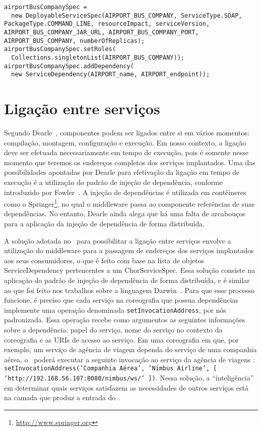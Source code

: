 \lstset{
language=Java,
}

{\scriptsize
\begin{lstlisting}[breaklines, caption={Trecho da especificação de uma coreografia.}, label={lst:service_spec}]
airportBusCompanySpec =
  new DeployableServiceSpec(AIRPORT_BUS_COMPANY, ServiceType.SOAP, PackageType.COMMAND_LINE, resourceImpact, serviceVersion, AIRPORT_BUS_COMPANY_JAR_URL, AIRPORT_BUS_COMPANY_PORT, AIRPORT_BUS_COMPANY, numberOfReplicas);
airportBusCompanySpec.setRoles(
  Collections.singletonList(AIRPORT_BUS_COMPANY));
airportBusCompanySpec.addDependency(
  new ServiceDependency(AIRPORT_name, AIRPORT_endpoint));
\end{lstlisting}
}

\section{Ligação entre serviços}
\label{sec:ligacao}

Segundo Dearle~\cite{Dearle2007PastPresentFuture}, componentes podem ser ligados entre si em vários momentos: compilação, montagem, configuração e execução. Em nosso contexto, a ligação deve ser efetuada necessariamente em tempo de execução, pois é somente nesse momento que teremos os endereços completos dos serviços implantados. Uma das possibilidades apontadas por Dearle para efetivação da ligação em tempo de execução é a utilização do padrão de injeção de dependência, conforme introduzido por Fowler~\cite{Fowler2004Inversion}. A injeção de dependências é utilizada em contêineres como o Springer\footnote{\url{http://www.springer.org}}, no qual o middleware passa ao componente referências de suas dependências. No entanto, Dearle ainda alega que há uma falta de arcabouços para a aplicação da injeção de dependência de forma distribuída.

A solução adotada no \ee\ para possibilitar a ligação entre serviços envolve a utilização do middleware para a passagem de endereços dos serviços implantados aos seus consumidores, o que é feito com base na lista de objetos \textsf{ServiceDependency} pertencentes a um \textsf{ChorServiceSpec}. Essa solução consiste na aplicação do padrão de injeção de dependência de forma distribuída, e é similar ao que foi feito nos trabalhos sobre a linguagem Darwin~\cite{Magee1996Dynamic, Magee1994Regis}. Para que esse processo funcione, é preciso que cada serviço na coreografia que possua dependências implemente uma operação denominada \texttt{setInvocationAddress}, por nós padronizada. Essa operação recebe como argumentos as seguintes informações sobre a dependência: papel do serviço, nome do serviço no contexto da coreografia e as URIs de acesso ao serviço.  Em uma coreografia em que, por exemplo, um serviço de agência de viagem dependa do serviço de uma companhia aérea, o \ee\ poderá executar a seguinte invocação ao serviço da agência de viagens : \texttt{setInvocationAddress('Companhia Aérea', 'Nimbus Airline', [ 'http://192.168.56.107:8080/nimbus/ws/' ])}. Nessa solução, a ``inteligência'' em determinar quais serviços satisfazem as necessidades de outros serviços está na camada que produz a entrada do \ee.

